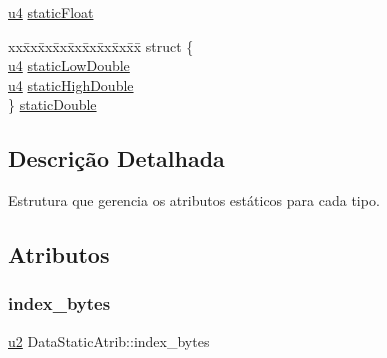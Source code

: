 \begin{DoxyCompactItemize}
\begin{tabbing}
\end{tabbing}\item 
\hyperlink{ClassLoader_8h_aedf6ddc03df8caaaccbb4c60b9a9b850}{u4} \hyperlink{unionDataStaticAtrib_a9ad6975d8a8bbc1b4587aad4077fc6c8}{static\+Float}
\item 
\begin{tabbing}
xx\=xx\=xx\=xx\=xx\=xx\=xx\=xx\=xx\=\kill
struct \{\\
\>\hyperlink{ClassLoader_8h_aedf6ddc03df8caaaccbb4c60b9a9b850}{u4} \hyperlink{unionDataStaticAtrib_a8ee07b1e266aef56917b0d24be2766e4}{staticLowDouble}\\
\>\hyperlink{ClassLoader_8h_aedf6ddc03df8caaaccbb4c60b9a9b850}{u4} \hyperlink{unionDataStaticAtrib_a64fbbc4728f4f98aa2fb483f5ab3110b}{staticHighDouble}\\
\} \hyperlink{unionDataStaticAtrib_a0c72eaebd5ce5602a9181140c217dcee}{staticDouble}\\

\end{tabbing}\end{DoxyCompactItemize}


\subsection{Descrição Detalhada}
Estrutura que gerencia os atributos estáticos para cada tipo. 

\subsection{Atributos}
\mbox{\label{unionDataStaticAtrib_ada02ebc6846de921edad741e3052b40e}} 
\subsubsection{\texorpdfstring{index\+\_\+bytes}{index\_bytes}}
{\footnotesize\ttfamily \hyperlink{ClassLoader_8h_a5f223212eef04d10a4550ded680cb1cf}{u2} Data\+Static\+Atrib\+::index\+\_\+bytes}

\mbox{\label{unionDataStaticAtrib_a30e703ce693927359d7f287e11b379e8}} 
